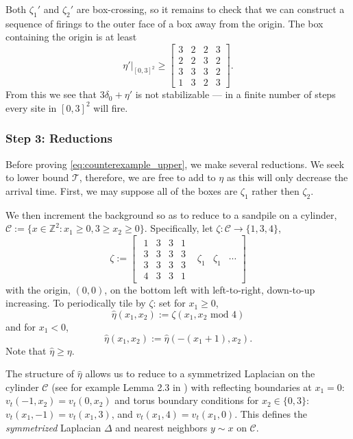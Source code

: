 \documentclass[aap]{imsart}
\newcommand{\Z}{\mathbb{Z}}
\begin{document}
Both $\zeta_1'$ and $\zeta_2'$ are box-crossing, so it remains to check 
that we can construct a sequence of firings to the outer face
of a box away from the origin. The box containing
the origin is at least
\[
\eta'|_{[0,3]^2} \geq
\begin{bmatrix}
3 & 2 & 2 & 3 \\
2 & 2 & 3 & 2 \\
3 & 3 & 3 & 2 \\
1 & 3 & 2 & 3
\end{bmatrix}.
\]
From this we see that $3  \delta_0 + \eta'$ is not stabilizable --- in a finite number of steps every site in $[0,3]^2$ will fire. 

\subsubsection*{Step 3: Reductions}
Before proving \eqref{eq:counterexample_upper}, we make several reductions.
We seek to lower bound $\mathcal{T}$, therefore, we are free to add
to $\eta$ as this will only decrease the arrival time. First, we may suppose all of the boxes are $\zeta_1$ rather then $\zeta_2$. 

We then increment the background so as to reduce to a sandpile on a cylinder,  $\mathcal{C} := \{ x \in \Z^2 : x_1 \geq 0,  3 \geq x_2 \geq 0\}$. 
Specifically, let $\zeta: \mathcal{C} \to \{1, 3, 4\}$, 
\[
\zeta := 
\begin{bmatrix}
\begin{matrix}
1 & 3 & 3 & 1 \\
3 & 3 & 3 & 3 \\
3 & 3 & 3 & 3 \\
4 & 3 & 3 & 1 
\end{matrix}
& \zeta_1 & \zeta_1 & \cdots
\end{bmatrix}
\]
with the origin, $(0,0)$, on the bottom left with left-to-right, down-to-up 
increasing.  To 
periodically tile by $\zeta$: set for $x_1 \geq 0$, 
\[
\hat{\eta}(x_1, x_2) :=
\zeta(x_1, x_2 \mbox{ mod } 4)
\]
and for $x_1 < 0$, 
\[
\hat{\eta}(x_1, x_2) := \hat{\eta}(-(x_1+1), x_2).
\]
Note that $\hat{\eta} \geq \eta$. 

The structure of $\hat{\eta}$ allows us to reduce
to a symmetrized Laplacian on the cylinder $\mathcal{C}$ (see for example Lemma 2.3 in \cite{bou2020dynamic}) with reflecting boundaries at $x_1 = 0$: $v_t(-1, x_2) = v_t(0,x_2)$
and torus boundary conditions for $x_2 \in \{0,3\}$: $v_t(x_1, -1) = v_t(x_1,3)$, and $v_t(x_1, 4) = v_t(x_1,0)$.  This defines the {\it symmetrized} Laplacian $\Delta$ and nearest neighbors $y \sim x$ on $\mathcal{C}$. 
\end{document}
